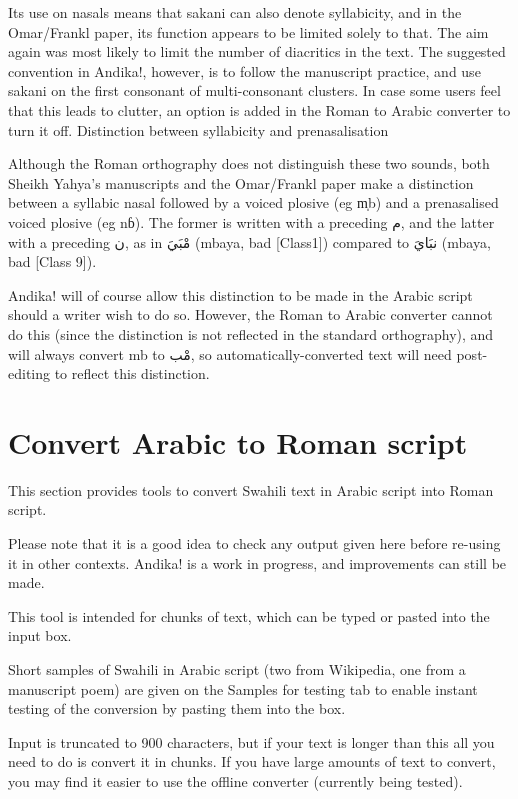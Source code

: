\documentclass[a4paper,10pt]{article}
\begin{document}
Its use on nasals means that sakani can also denote syllabicity, and in the Omar/Frankl paper, its function appears to be limited solely to that. The aim again was most likely to limit the number of diacritics in the text. The suggested convention in Andika!, however, is to follow the manuscript practice, and use sakani on the first consonant of multi-consonant clusters. In case some users feel that this leads to clutter, an option is added in the Roman to Arabic converter to turn it off.
Distinction between syllabicity and prenasalisation

Although the Roman orthography does not distinguish these two sounds, both Sheikh Yahya's manuscripts and the Omar/Frankl paper make a distinction between a syllabic nasal followed by a voiced plosive (eg m̩b) and a prenasalised voiced plosive (eg nɓ). The former is written with a preceding ْم, and the latter with a preceding ن, as in مْبَيَ (mbaya, bad [Class1]) compared to نبَايَ (mbaya, bad [Class 9]).

Andika! will of course allow this distinction to be made in the Arabic script should a writer wish to do so. However, the Roman to Arabic converter cannot do this (since the distinction is not reflected in the standard orthography), and will always convert mb to مْب, so automatically-converted text will need post-editing to reflect this distinction.


\section{Convert Arabic to Roman script}

This section provides tools to convert Swahili text in Arabic script into Roman script.

Please note that it is a good idea to check any output given here before re-using it in other contexts. Andika! is a work in progress, and improvements can still be made.

This tool is intended for chunks of text, which can be typed or pasted into the input box.

Short samples of Swahili in Arabic script (two from Wikipedia, one from a manuscript poem) are given on the Samples for testing tab to enable instant testing of the conversion by pasting them into the box.

Input is truncated to 900 characters, but if your text is longer than this all you need to do is convert it in chunks. If you have large amounts of text to convert, you may find it easier to use the offline converter (currently being tested).
\end{document}
